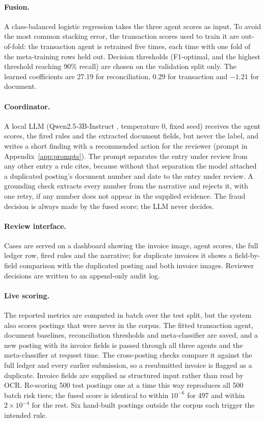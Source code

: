 \documentclass{article}
\begin{document}
\paragraph{Fusion.} A class-balanced logistic regression takes the three agent scores as input. To avoid the most common stacking error, the transaction scores used to train it are out-of-fold: the transaction agent is retrained five times, each time with one fold of the meta-training rows held out. Decision thresholds (F1-optimal, and the highest threshold reaching 90\% recall) are chosen on the validation split only. The learned coefficients are 27.19 for reconciliation, 0.29 for transaction and $-1.21$ for document.

\paragraph{Coordinator.} A local LLM (Qwen2.5-3B-Instruct \citep{qwen2025qwen25}, temperature 0, fixed seed) receives the agent scores, the fired rules and the extracted document fields, but never the label, and writes a short finding with a recommended action for the reviewer (prompt in Appendix~\ref{app:prompts}). The prompt separates the entry under review from any other entry a rule cites, because without that separation the model attached a duplicated posting's document number and date to the entry under review. A grounding check extracts every number from the narrative and rejects it, with one retry, if any number does not appear in the supplied evidence. The fraud decision is always made by the fused score; the LLM never decides.

\paragraph{Review interface.} Cases are served on a dashboard showing the invoice image, agent scores, the full ledger row, fired rules and the narrative; for duplicate invoices it shows a field-by-field comparison with the duplicated posting and both invoice images. Reviewer decisions are written to an append-only audit log.

\paragraph{Live scoring.} The reported metrics are computed in batch over the test split, but the system also scores postings that were never in the corpus. The fitted transaction agent, document baselines, reconciliation thresholds and meta-classifier are saved, and a new posting with its invoice fields is passed through all three agents and the meta-classifier at request time. The cross-posting checks compare it against the full ledger and every earlier submission, so a resubmitted invoice is flagged as a duplicate. Invoice fields are supplied as structured input rather than read by OCR. Re-scoring 500 test postings one at a time this way reproduces all 500 batch risk tiers; the fused score is identical to within $10^{-6}$ for 497 and within $2\times10^{-4}$ for the rest. Six hand-built postings outside the corpus each trigger the intended rule.
\end{document}
